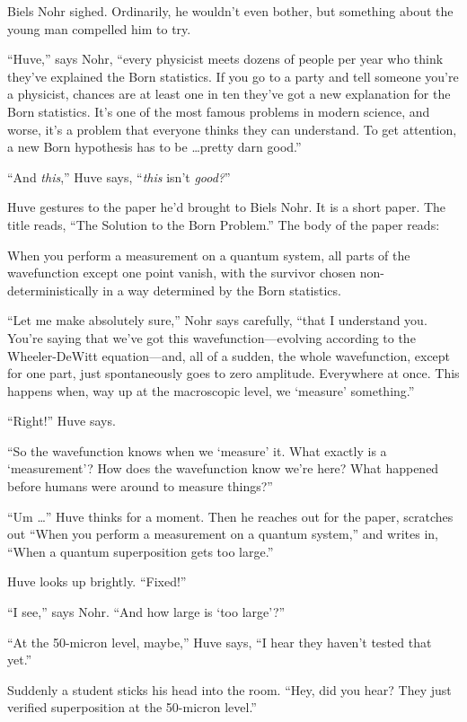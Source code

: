 {
 Biels Nohr sighed. Ordinarily, he wouldn't even
bother, but something about the young man compelled him to try.}

{
 ``Huve,'' says Nohr,
``every physicist meets dozens of people per year who
think they've explained the Born statistics. If you go
to a party and tell someone you're a physicist, chances
are at least one in ten they've got a new explanation
for the Born statistics. It's one of the most famous
problems in modern science, and worse, it's a problem
that everyone thinks they can understand. To get attention, a new Born
hypothesis has to be \ldots pretty darn good.''}

{
 ``And \textit{this},'' Huve
says, ``\textit{this} isn't
\textit{good?}''}

{
 Huve gestures to the paper he'd brought to Biels
Nohr. It is a short paper. The title reads, ``The
Solution to the Born Problem.'' The body of the paper
reads:}

{
 When you perform a measurement on a quantum system, all parts of
the wavefunction except one point vanish, with the survivor chosen
non-deterministically in a way determined by the Born statistics.}

{
 ``Let me make absolutely
sure,'' Nohr says carefully, ``that
I understand you. You're saying that
we've got this wavefunction---evolving according to the
Wheeler-DeWitt equation---and, all of a sudden, the whole wavefunction,
except for one part, just spontaneously goes to zero amplitude.
Everywhere at once. This happens when, way up at the macroscopic level,
we `measure'
something.''}

{
 ``Right!'' Huve says.}

{
 ``So the wavefunction knows when we
`measure' it. What exactly is a
`measurement'? How does the wavefunction
know we're here? What happened before humans were
around to measure things?''}

{
 ``Um \ldots'' Huve thinks for a
moment. Then he reaches out for the paper, scratches out
``When you perform a measurement on a quantum
system,'' and writes in, ``When a
quantum superposition gets too large.''}

{
 Huve looks up brightly.
``Fixed!''}

{
 ``I see,'' says Nohr.
``And how large is `too
large'?''}

{
 ``At the 50-micron level,
maybe,'' Huve says, ``I hear they
haven't tested that yet.''}

{
 Suddenly a student sticks his head into the room.
``Hey, did you hear? They just verified superposition
at the 50-micron level.''}

